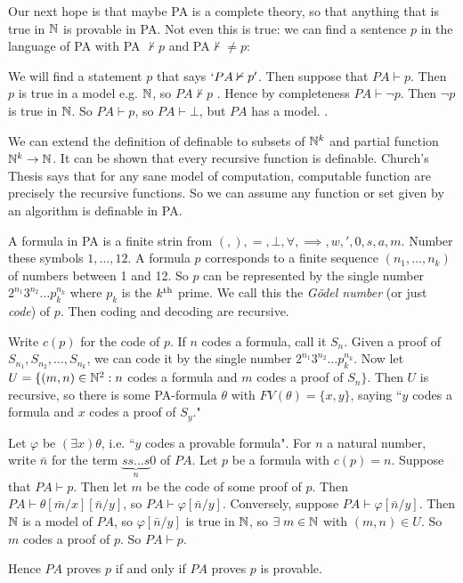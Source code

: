 \documentclass[10pt,a4paper]{article}
\begin{document}
Our next hope is that maybe PA is a complete theory, so that anything that is true in $\mathbb{N}$ is provable in PA. Not even this is true: we can find a sentence $p$ in the language of PA with PA $\nvdash p$ and PA$\nvdash \neq p$:

We will find a statement $p$ that says $`PA \nvdash p'$. Then suppose that $PA\vdash p$. Then $p$ is true in a model e.g. $\mathbb{N}$, so $PA\nvdash p$ \contr. Hence by completeness $PA \vdash  \neg p$. Then $\neg p$ is true in $\mathbb{N}$. So $PA \vdash p$, so $PA \vdash \bot$, but $PA$ has a model. \contr.

We can extend the definition of definable to subsets of $\mathbb{N}^k$ and partial function $\mathbb{N}^k \to \mathbb{N}$. It can be shown that every recursive function is definable. Church's Thesis says that for any sane model of computation, computable function are precisely the recursive functions. So we can assume any function or set given by an algorithm is definable in PA.

A formula in PA is a finite strin from $(, ), =, \bot, \forall, \implies, w, ', 0,s,a,m$. Number these symbols $1, \ldots, 12$. A formula $p$ corresponds to a finite sequence $(n_1, \ldots, n_k)$ of numbers between 1 and 12. So $p$ can be represented by the single number $2^{n_1}3^{n_2}\ldots p_k^{n_k}$ where $p_k$ is the $k\textsuperscript{th}$ prime. We call this the \emph{G\"odel number} (or just \emph{code}) of $p$. Then coding and decoding are recursive.

Write $c(p)$ for the code of $p$. If $n$ codes a formula, call it $S_n$. Given a proof of $S_{n_1}, S_{n_2}, \ldots, S_{n_k}$, we can code it by the single number $2^{n_1}3^{n_2}\ldots p_k^{n_k}$. Now let $U = \{(m,n) \in \mathbb{N}^2 : n$ codes a formula and $m$ codes a proof of $S_n\}$. Then $U$ is recursive, so there is some PA-formula $\theta$ with $FV(\theta)  = \{x, y\}$, saying ``$y$ codes a formula and $x$ codes a proof of $S_y$."

Let $\varphi$ be $(\exists x)\theta$, i.e. ``$y$ codes a provable formula". For $n$ a natural number, write $\bar{n}$ for the term $\underbrace{ss\ldots s}_n 0$ of $PA$. Let $p$ be a formula with $c(p) = n$. Suppose that $PA \vdash p$. Then let $m$ be the code of some proof of $p$. Then $PA \vdash \theta[\bar{m}/x][\bar{n}/y]$, so $PA\vdash \varphi[\bar{n}/y]$. Conversely, suppose $PA \vdash \varphi[\bar{n}/y]$. Then $\mathbb{N}$ is a model of $PA$, so $\varphi[\bar{n}/y]$ is true in $\mathbb{N}$, so $\exists m \in \N$ with $(m,n) \in U$. So $m$ codes a proof of $p$. So $PA \vdash p$.

Hence $PA$ proves $p$ if and only if $PA$ proves $p$ is provable.
\end{document}
